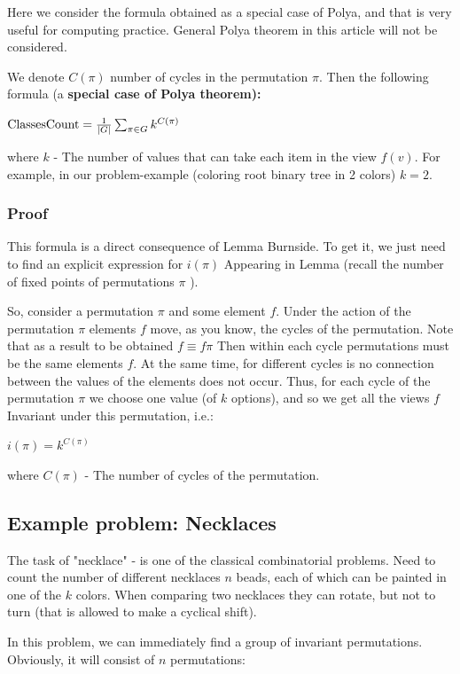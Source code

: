 Here we consider the formula obtained as a special case of Polya, and that is very useful for computing practice. General Polya theorem in this article will not be considered.

We denote $C (\pi)$ number of cycles in the permutation $\pi$. Then the following formula (a \textbf{special case of Polya theorem):}

${\rm ClassesCount}=\frac{1}{|G|}\sum_{\pi\in G}k^{C(\pi)}$

where $k$ - The number of values ​​that can take each item in the view $f (v)$. For example, in our problem-example (coloring root binary tree in 2 colors) $k = 2$.

\subsubsection{ Proof }

This formula is a direct consequence of Lemma Burnside. To get it, we just need to find an explicit expression for $i (\pi)$ Appearing in Lemma (recall the number of fixed points of permutations $\pi$ ).

So, consider a permutation $\pi$ and some element $f$. Under the action of the permutation $\pi$ elements $f$ move, as you know, the cycles of the permutation. Note that as a result to be obtained $f \equiv f \pi$ Then within each cycle permutations must be the same elements $f$. At the same time, for different cycles is no connection between the values ​​of the elements does not occur. Thus, for each cycle of the permutation $\pi$ we choose one value (of $k$ options), and so we get all the views $f$ Invariant under this permutation, i.e.:

$i (\pi) = k ^ {C (\pi)}$

where $C (\pi)$ - The number of cycles of the permutation.

\subsection{ Example problem: Necklaces }

The task of "necklace" - is one of the classical combinatorial problems. Need to count the number of different necklaces $n$ beads, each of which can be painted in one of the $k$ colors. When comparing two necklaces they can rotate, but not to turn (that is allowed to make a cyclical shift).

In this problem, we can immediately find a group of invariant permutations. Obviously, it will consist of $n$ permutations:

